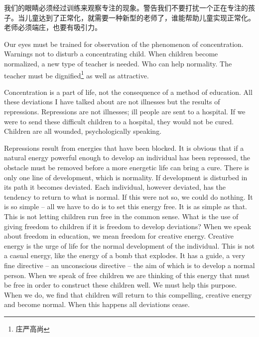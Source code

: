 \documentclass[lang=cn,10pt]{elegantbook}
\begin{document}
我们的眼睛必须经过训练来观察专注的现象。警告我们不要打扰一个正在专注的孩子。当儿童达到了正常化，就需要一种新型的老师了，谁能帮助儿童实现正常化。老师必须端庄，也要有吸引力。

Our eyes must be trained for observation of the phenomenon of concentration. Warnings not to disturb a concentrating child. When children become normalized, a new type of teacher is needed. Who can help normality. The teacher must be dignified\footnote{庄严高尚} as well as attractive.

Concentration is a part of life, not the consequence of a method of
education. All these deviations I have talked about are not illnesses
but the results of repressions. Repressions are not illnesses; ill
people are sent to a hospital. If we were to send these difficult
children to a hospital, they would not be cured. Children are all
wounded, psychologically speaking.

Repressions result from energies that have been blocked. It is
obvious that if a natural energy powerful enough to develop an
individual has been repressed, the obstacle must be removed before
a more energetic life can bring a cure. There is only one line of
development, which is normality. If development is disturbed in its
path it becomes deviated. Each individual, however deviated, has
the tendency to return to what is normal. If this were not so, we could
do nothing. It is so simple – all we have to do is to set this energy
free. It is as simple as that. This is not letting children run free in the
common sense. What is the use of giving freedom to children if it is
freedom to develop deviations? When we speak about freedom in
education, we mean freedom for creative energy. Creative energy is
the urge of life for the normal development of the individual. This is
not a casual energy, like the energy of a bomb that explodes. It has a
guide, a very fine directive – an unconscious directive – the aim of
which is to develop a normal person. When we speak of free children
we are thinking of this energy that must be free in order to construct
these children well. We must help this purpose. When we do, we find
that children will return to this compelling, creative energy and
become normal. When this happens all deviations cease.
\end{document}
